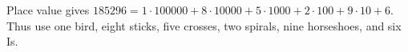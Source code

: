 Place value gives $185296=1\cdot100000+8\cdot10000+5\cdot1000+2\cdot100+9\cdot10+6$. Thus use one bird, eight sticks, five crosses, two spirals, nine horseshoes, and six Is.
